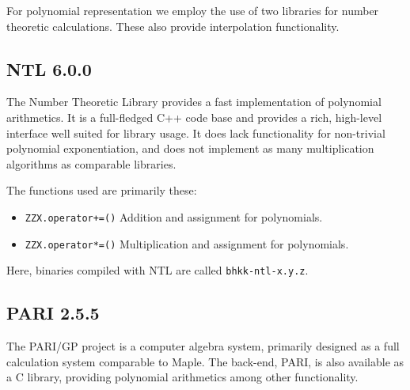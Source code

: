 \documentclass[a4paper]{article}
\newcommand{\code}{\texttt}
\begin{document}
For polynomial representation we employ the use of two libraries for number theoretic calculations. These also provide interpolation functionality.

\subsection{NTL 6.0.0}
The Number Theoretic Library \cite{ntl} provides a fast implementation of polynomial arithmetics. It is a full-fledged C++ code base and provides a rich, high-level interface well suited for library usage. It does lack functionality for non-trivial polynomial exponentiation, and does not implement as many multiplication algorithms as comparable libraries.


The functions used are primarily these: 

\begin{itemize}
\item \code{ZZX.operator+=()}
\subitem Addition and assignment for polynomials. %
\item \code{ZZX.operator*=()}
\subitem Multiplication and assignment for polynomials. %
\end{itemize}

Here, binaries compiled with NTL are called \code{bhkk-ntl-x.y.z}.

\subsection{PARI 2.5.5}
The PARI/GP project \cite{pari} is a computer algebra system, primarily designed as a full calculation system comparable to Maple. The back-end, PARI, is also available as a C library, providing polynomial arithmetics among other functionality.

\end{document}
